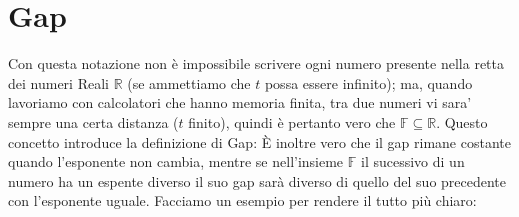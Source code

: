 \section{Gap}
Con questa notazione non è impossibile scrivere ogni numero presente nella retta dei numeri Reali $\mathbb{R}$ (se ammettiamo che $ t $ possa essere infinito); ma, quando lavoriamo con calcolatori che hanno memoria finita, tra due numeri vi sara' sempre una certa distanza ($ t $ finito), quindi è pertanto vero che $\mathbb{F}\subseteq \mathbb{R}$. Questo concetto introduce la definizione di Gap:
È inoltre vero che il gap rimane costante quando l'esponente non cambia, mentre se nell'insieme $\mathbb{F}$ il sucessivo di un numero ha un espente diverso il suo gap sarà diverso di quello del suo precedente con l'esponente uguale. Facciamo un esempio per rendere il tutto più chiaro:
